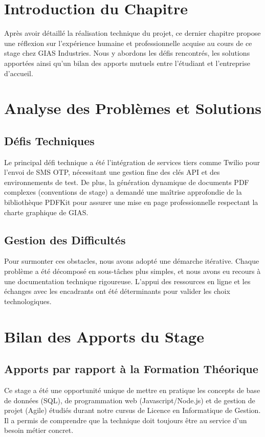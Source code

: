\section{Introduction du Chapitre}
Après avoir détaillé la réalisation technique du projet, ce dernier chapitre propose une réflexion sur l'expérience humaine et professionnelle acquise au cours de ce stage chez GIAS Industries. Nous y abordons les défis rencontrés, les solutions apportées ainsi qu'un bilan des apports mutuels entre l'étudiant et l'entreprise d'accueil.

\section{Analyse des Problèmes et Solutions}

\subsection{Défis Techniques}
Le principal défi technique a été l'intégration de services tiers comme Twilio pour l'envoi de SMS OTP, nécessitant une gestion fine des clés API et des environnements de test. De plus, la génération dynamique de documents PDF complexes (conventions de stage) a demandé une maîtrise approfondie de la bibliothèque PDFKit pour assurer une mise en page professionnelle respectant la charte graphique de GIAS.

\subsection{Gestion des Difficultés}
Pour surmonter ces obstacles, nous avons adopté une démarche itérative. Chaque problème a été décomposé en sous-tâches plus simples, et nous avons eu recours à une documentation technique rigoureuse. L'appui des ressources en ligne et les échanges avec les encadrants ont été déterminants pour valider les choix technologiques.

\section{Bilan des Apports du Stage}

\subsection{Apports par rapport à la Formation Théorique}
Ce stage a été une opportunité unique de mettre en pratique les concepts de base de données (SQL), de programmation web (Javascript/Node.js) et de gestion de projet (Agile) étudiés durant notre cursus de Licence en Informatique de Gestion. Il a permis de comprendre que la technique doit toujours être au service d'un besoin métier concret.

